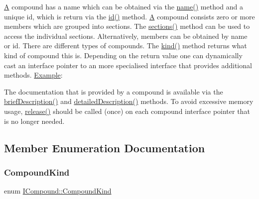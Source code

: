 \mbox{\hyperlink{class_a}{A}} compound has a name which can be obtained via the \mbox{\hyperlink{class_i_compound_ae14b5dcf513ef0d263119aeb2e2ffb15}{name()}} method and a unique id, which is return via the \mbox{\hyperlink{class_i_compound_ac5c371dee7e65324518532b0a58c2d9f}{id()}} method. \mbox{\hyperlink{class_a}{A}} compound consists zero or more members which are grouped into sections. The \mbox{\hyperlink{class_i_compound_a966a7cac6a4f33f16ef869e74855ab3b}{sections()}} method can be used to access the individual sections. Alternatively, members can be obtained by name or id. There are different types of compounds. The \mbox{\hyperlink{class_i_compound_ad0d6fb22a48b5bbddae2b88a3cab3640}{kind()}} method returns what kind of compound this is. Depending on the return value one can dynamically cast an interface pointer to an more specialised interface that provides additional methods. \mbox{\hyperlink{struct_example}{Example}}\+: 
\begin{DoxyCode}{0}
\DoxyCodeLine{\{}
\DoxyCodeLine{  \textcolor{comment}{// use methods of IClass}}
\DoxyCodeLine{\}}
\end{DoxyCode}
 The documentation that is provided by a compound is available via the \mbox{\hyperlink{class_i_compound_a1ac3073130ef6bdd552c275e488c0658}{brief\+Description()}} and \mbox{\hyperlink{class_i_compound_a9630b083767887a40040cb4408d538cd}{detailed\+Description()}} methods. To avoid excessive memory usage, \mbox{\hyperlink{class_i_compound_a5388c74d390323ce610f752a01456b21}{release()}} should be called (once) on each compound interface pointer that is no longer needed. 

\subsection{Member Enumeration Documentation}
\mbox{\label{class_i_compound_a6b86be2ca9f6759434c1dd8405be328a}} 
\subsubsection{\texorpdfstring{CompoundKind}{CompoundKind}\hspace{0.1cm}{\footnotesize\ttfamily [1/2]}}
{\footnotesize\ttfamily enum \mbox{\hyperlink{class_i_compound_a6b86be2ca9f6759434c1dd8405be328a}{I\+Compound\+::\+Compound\+Kind}}}

